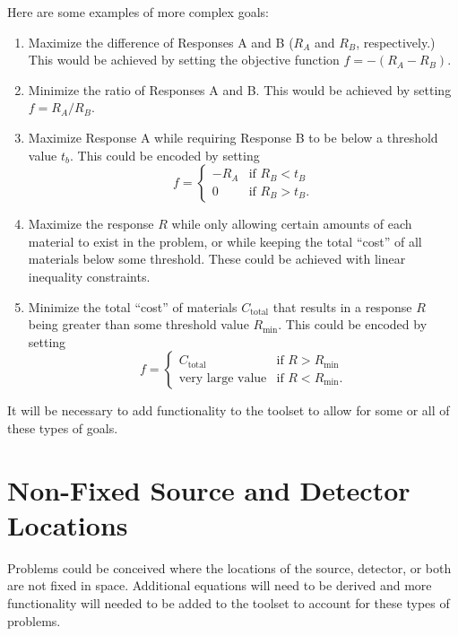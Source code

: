 Here are some examples of more complex goals:
\begin{enumerate}
  \item Maximize the difference of Responses A and B ($R_A$ and $R_B$, respectively.)
        This would be achieved by setting the objective function $f = -\left(R_A - R_B\right)$.
  \item Minimize the ratio of Responses A and B.
        This would be achieved by setting $f = R_A/R_B$.
  \item Maximize Response A while requiring Response B to be below a threshold value $t_b$.
        This could be encoded by setting \[f = \begin{cases} -R_A & \text{if } R_B < t_B \\ 0 & \text{if } R_B > t_B. \end{cases}\]
  \item Maximize the response $R$ while only allowing certain amounts of each material to exist in the problem, or while keeping the total ``cost'' of all materials below some threshold.
        These could be achieved with linear inequality constraints.
  \item Minimize the total ``cost'' of materials $C_\text{total}$ that results in a response $R$ being greater than some threshold value $R_\text{min}$.
        This could be encoded by setting \[f = \begin{cases} C_\text{total} & \text{if } R > R_\text{min} \\ \text{very large value} & \text{if } R < R_\text{min}. \end{cases}\]
\end{enumerate}

It will be necessary to add functionality to the toolset to allow for some or all of these types of goals.

\section{Non-Fixed Source and Detector Locations}
\label{sec:proposal:moving_source_and_detector}

Problems could be conceived where the locations of the source, detector, or both are not fixed in space.
Additional equations will need to be derived and more functionality will needed to be added to the toolset to account for these types of problems.

